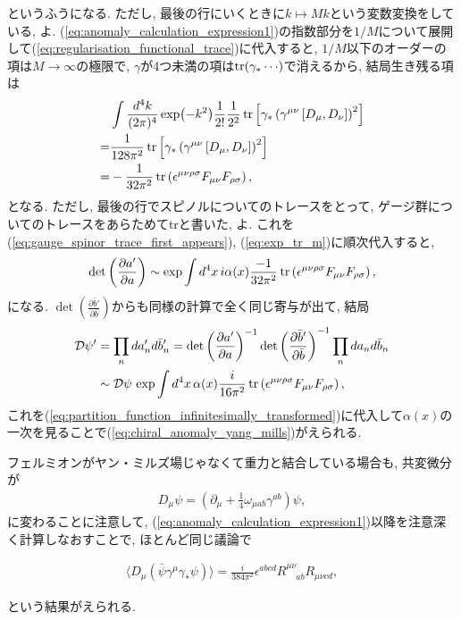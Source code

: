 \documentclass{ltjsarticle}
\theoremstyle{definition}
\newcommand{\parno}{\par\noindent}
\begin{document}
というふうになる. ただし, 最後の行にいくときに$k\mapsto Mk$という変数変換をしている, よ. (\ref{eq:anomaly_calculation_expression1})の指数部分を$1/M$について展開して(\ref{eq:regularisation_functional_trace})に代入すると, $1/M$以下のオーダーの項は$M\to\infty$の極限で, $\gamma$が4つ未満の項は$\tr(\gamma_\ast\cdots)$で消えるから, 結局生き残る項は
\begin{align}
  &\int\frac{d^4k}{(2\pi)^4}\exp(-k^2)\frac1{2!}\frac1{2^2}\tr\left[\gamma_\ast\left(\gamma^{\mu\nu}\left[D_\mu,D_\nu\right]\right)^2\right]\\
  =&\frac1{128\pi^2}\tr\left[\gamma_\ast\left(\gamma^{\mu\nu}\left[D_\mu,D_\nu\right]\right)^2\right]\\
  =&-\frac1{32\pi^2}\tr\left(\epsilon^{\mu\nu\rho\sigma}F_{\mu\nu}F_{\rho\sigma}\right),
\end{align}
となる. ただし, 最後の行でスピノルについてのトレースをとって, ゲージ群についてのトレースをあらためてtrと書いた, よ. これを(\ref{eq:gauge_spinor_trace_first_appears}), (\ref{eq:exp_tr_m})に順次代入すると,
\begin{gather}
  \det\left(\frac{\partial a'}{\partial a}\right)\sim\exp\int d^4x\,i\alpha(x)\frac{-1}{32\pi^2}\tr\left(\epsilon^{\mu\nu\rho\sigma}F_{\mu\nu}F_{\rho\sigma}\right),
\end{gather}
になる. $\det\displaystyle\left(\frac{\partial \bar b'}{\partial \bar b}\right)$からも同様の計算で全く同じ寄与が出て, 結局
\begin{align}
  \mathcal D\psi'&=\prod_nda_n'd\bar b_n'=\det\left(\frac{\partial a'}{\partial a}\right)^{-1}\det\displaystyle\left(\frac{\partial \bar b'}{\partial \bar b}\right)^{-1}\prod_nda_nd\bar b_n\\
  &\sim \mathcal D\psi\,\exp\int d^4x\,\alpha(x)\frac i{16\pi^2}\tr\left(\epsilon^{\mu\nu\rho\sigma}F_{\mu\nu}F_{\rho\sigma}\right),
\end{align}
これを(\ref{eq:partition_function_infinitesimally_transformed})に代入して$\alpha(x)$の一次を見ることで(\ref{eq:chiral_anomaly_yang_mills})がえられる.
\par
フェルミオンがヤン・ミルズ場じゃなくて重力と結合している場合も, 共変微分が
\begin{gather}
  D_\mu\psi=\left(\partial_\mu+\frac14\omega_{\mu ab}\gamma^{ab}\right)\psi,
\end{gather}
に変わることに注意して, (\ref{eq:anomaly_calculation_expression1})以降を注意深く計算しなおすことで, ほとんど同じ議論で
\begin{tcolorbox}
  \begin{gather}
    \langle D_\mu\left(\bar\psi\gamma^\mu\gamma_\ast\psi\right)\rangle=\frac i{384\pi^2}\epsilon^{abcd}R^{\mu\nu}_{\phantom{\mu\nu}ab}R_{\mu\nu cd},
  \end{gather}
\end{tcolorbox}
\parno
という結果がえられる.
\end{document}
